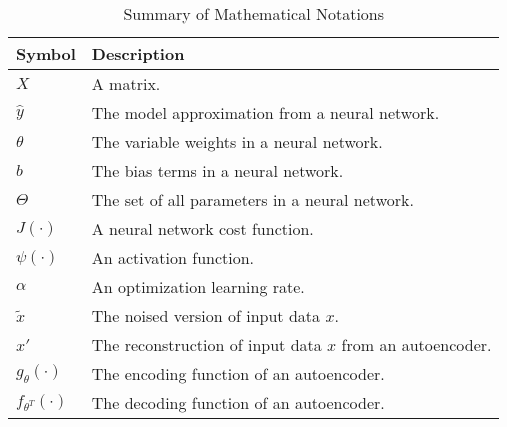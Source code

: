 \begin{table}[ht]
\caption{Summary of Mathematical Notations} %
\centering %
\begin{tabular}{l l} %
\hline %
Symbol & Description \\ %
\hline %
$X$ & A matrix. \\ %
$\hat{y}$ & The model approximation from a neural network.  \\
$\theta$ & The variable weights in a neural network.  \\
$b$ & The bias terms in a neural network. \\  %
$\Theta$ & The set of all parameters in a neural network.  \\
$J(\cdot)$ & A neural network cost function. \\
$\psi(\cdot)$ & An activation function. \\
$\alpha$ & An optimization learning rate. \\
$\tilde{x}$ & The noised version of input data $x$.  \\
$x'$ & The reconstruction of input data $x$ from an autoencoder.  \\
$g_{\theta}(\cdot)$ & The encoding function of an autoencoder.  \\
$f_{\theta^{T}}(\cdot)$ & The decoding function of an autoencoder.  \\ [1ex]
\hline %
\end{tabular}
\label{table:notation}
\end{table}
